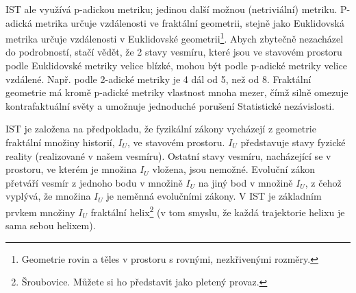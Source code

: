 IST ale využívá p-adickou metriku; jedinou další možnou (netriviální) metriku. P-adická metrika určuje vzdálenosti ve fraktální geometrii, stejně jako Euklidovská metrika určuje vzdálenosti v Euklidovské geometrii\footnote[22]{Geometrie rovin a těles v prostoru s rovnými, nezkřivenými rozměry.}. Abych zbytečně nezacházel do podrobností, stačí vědět, že 2 stavy vesmíru, které jsou ve stavovém prostoru podle Euklidovské metriky velice blízké, mohou být podle p-adické metriky velice vzdálené. Např. podle 2-adické metriky je 4 dál od 5, než od 8. Fraktální geometrie má kromě p-adické metriky vlastnost mnoha mezer, čímž silně omezuje kontrafaktuální světy a umožnuje jednoduché porušení Statistické nezávislosti.

IST je založena na předpokladu, že fyzikální zákony vycházejí z geometrie fraktální množiny historií, $I_U$, ve stavovém prostoru. $I_U$ představuje stavy fyzické reality (realizované v našem vesmíru). Ostatní stavy vesmíru, nacházející se v prostoru, ve kterém je množina $I_U$ vložena, jsou nemožné. Evoluční zákon přetváří vesmír z jednoho bodu v množině $I_U$ na jiný bod v množině $I_U$, z čehož vyplývá, že množina $I_U$ je neměnná evolučními zákony. V IST je základním prvkem množiny $I_U$ fraktální helix\footnote[23]{Šroubovice. Můžete si ho představit jako pletený provaz.} (v tom smyslu, že každá trajektorie helixu je sama sebou helixem).
